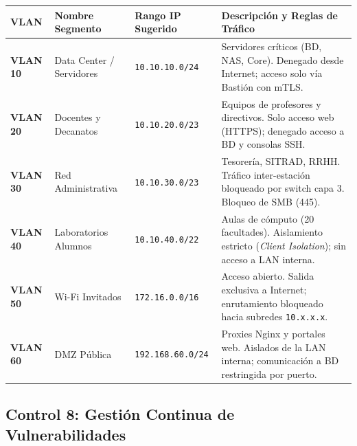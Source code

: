 \vspace{-0.2cm}
\begin{center}
\scriptsize
\setlength{\tabcolsep}{3.5pt}
\renewcommand{\arraystretch}{1.08}
\begin{tabular}{>{\raggedright\bfseries}p{1.6cm} >{\raggedright}p{2.9cm} >{\centering}p{2.5cm} >{\raggedright\arraybackslash}p{7.2cm}}
\toprule
\rowcolor{outermarginbgcolor}
VLAN & Nombre Segmento & Rango IP Sugerido & Descripción y Reglas de Tráfico \\
\midrule
VLAN 10 & Data Center / Servidores & \texttt{10.10.10.0/24} & Servidores críticos (BD, NAS, Core). Denegado desde Internet; acceso solo vía Bastión con mTLS. \\
\midrule
VLAN 20 & Docentes y Decanatos & \texttt{10.10.20.0/23} & Equipos de profesores y directivos. Solo acceso web (HTTPS); denegado acceso a BD y consolas SSH. \\
\midrule
VLAN 30 & Red Administrativa & \texttt{10.10.30.0/23} & Tesorería, SITRAD, RRHH. Tráfico inter-estación bloqueado por switch capa 3. Bloqueo de SMB (445). \\
\midrule
VLAN 40 & Laboratorios Alumnos & \texttt{10.10.40.0/22} & Aulas de cómputo (20 facultades). Aislamiento estricto (\textit{Client Isolation}); sin acceso a LAN interna. \\
\midrule
VLAN 50 & Wi-Fi Invitados & \texttt{172.16.0.0/16} & Acceso abierto. Salida exclusiva a Internet; enrutamiento bloqueado hacia subredes \texttt{10.x.x.x}. \\
\midrule
VLAN 60 & DMZ Pública & \texttt{192.168.60.0/24} & Proxies Nginx y portales web. Aislados de la LAN interna; comunicación a BD restringida por puerto. \\
\bottomrule
\end{tabular}
\end{center}

\vspace{0.1cm}
\subsection{Control 8: Gestión Continua de Vulnerabilidades}

